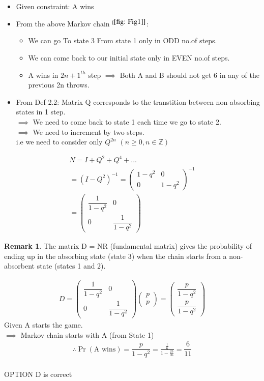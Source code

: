 \documentclass[journal,12pt,twocolumn]{IEEEtran}
\theoremstyle{definition}
\newtheorem*{remark}{Remark}
\providecommand{\pr}[1]{\ensuremath{\Pr\left(#1\right)}}
\newcommand{\myvec}[1]{\ensuremath{\begin{pmatrix}#1\end{pmatrix}}}
\begin{document}
\begin{itemize}
    \item  Given constraint: A wins\\
    \item From the above Markov chain $^{[\ref{fig: Fig1]}}$:\\
    \begin{itemize}
        \item We can go To state 3 From state 1 only in ODD no.of steps.
        \item We can come back to our initial state only in EVEN no.of steps.
        \item A wins in ${2n+1}^{th}$ step $\implies$ Both A and B should not get 6 in any of the previous 2n throws.
    \end{itemize}
    \item From Def 2.2: Matrix Q corresponds to the transtition between non-absorbing states in 1 step.\\
    $\implies$ We need to come back to state 1 each time we go to state 2.\\
    $\implies$ We need to increment by two steps.\\
    i.e we need to consider only $Q^{2n}$ $(n \ge 0, n \in \mathbb{Z}) $\\
\end{itemize}
\begin{align}
    N = I + Q^2 + Q^4 + ...\\
    = (I - Q^2)^{-1} = \myvec{1 - q^2 & 0\\ 0 & 1 - q^2}^{-1} \\ 
    =\myvec{\dfrac{1}{1 - q^2} & 0\\ 0 & \dfrac{1}{1 - q^2}}
\end{align}
\begin{remark}
    \item The matrix D = NR (fundamental matrix) gives the probability of ending up in the absorbing state (state 3) when the chain starts from a non-absorbent state (states 1 and 2).
\end{remark}
\begin{align}
    D = \myvec{\dfrac{1}{1 - q^2} & 0\\ 0 & \dfrac{1}{1 - q^2}} \myvec{p\\p} = \myvec{\dfrac{p}{1 - q^2}\\ \dfrac{p}{1 - q^2}}
\end{align}
Given A starts the game.\\
$\implies$ Markov chain starts with A (from State 1)
\large
\begin{align}
    \therefore \pr{\text{A wins}} = \dfrac{p}{1 - q^2}= \frac{\frac{1}{6}}{1 - \frac{25}{36}} = \dfrac{6}{11}
\end{align}\\[7pt]
        \centering
OPTION D is correct
\end{document}
